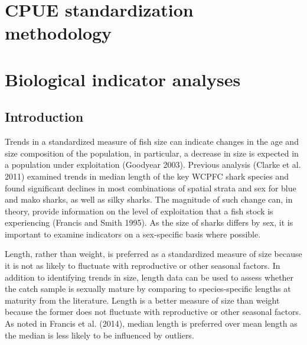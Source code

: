 \documentclass[12pt]{SCreport}
\begin{document}

\section{CPUE standardization methodology}
      
     
      
\section{Biological indicator analyses}
      \subsection{Introduction}
Trends in a standardized measure of fish size can indicate changes in the age and size composition of the population, in particular, a decrease in size is expected in a population under exploitation (Goodyear 2003).  Previous analysis (Clarke et al. 2011) examined trends in median length of the key WCPFC shark species and 
found significant declines in most combinations of spatial strata and sex for blue and mako sharks, as well as silky sharks.  The magnitude of such change can, in theory, provide information on the level of exploitation that a fish stock is experiencing (Francis and Smith 1995). As the size of sharks differs by sex, it is important to examine indicators on a sex-specific basis where possible. 

Length, rather than weight, is preferred as a standardized measure of size because it is not as likely to fluctuate with reproductive or other seasonal factors. In addition to identifying trends in size, length data can be used to assess whether the catch sample is sexually mature by comparing to species-specific lengths at maturity from the literature.  Length is a better measure of size than weight because the former does not fluctuate with reproductive or other seasonal factors. As noted in Francis et al. (2014), median length is preferred over mean length as the median is less likely to be influenced by outliers. 
\end{document}
